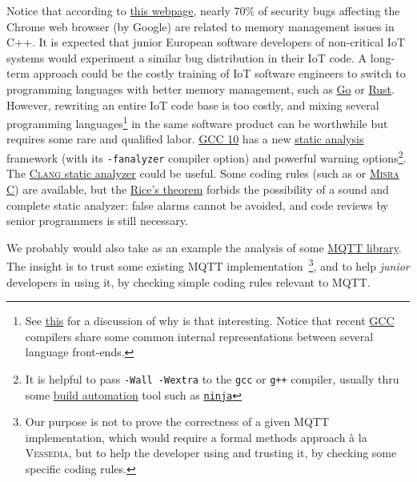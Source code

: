Notice that according to
\href{https://www.zdnet.com/article/chrome-70-of-all-security-bugs-are-memory-safety-issues/}{this
  webpage}, nearly 70\% of security bugs affecting the Chrome web
browser (by Google) are related to memory management issues in C++.
It is expected that junior European software developers of
non-critical IoT systems would experiment a similar bug distribution
in their IoT code. A long-term approach could be the costly training
of IoT software engineers to switch to programming languages with
better memory management, such as \href{https://golang.org/}{Go} or
\href{https://www.rust-lang.org/}{Rust}. However, rewriting an entire
IoT code base is too costly, and mixing several programming
languages\footnote{See
\href{https://softwareengineering.stackexchange.com/questions/370135/why-are-multiple-programming-languages-used-in-the-development-of-one-product-or}{this}
for a discussion of why is that interesting. Notice that recent
\href{http://gcc.gnu.org/}{GCC} compilers share some common internal
representations between several language front-ends.} in the same
software product can be worthwhile but requires some rare and
qualified labor. \href{https://gcc.gnu.org/gcc-10}{GCC 10} has a new
\href{https://gcc.gnu.org/onlinedocs/gcc/Static-Analyzer-Options.html}{static
  analysis} framework (with its \texttt{-fanalyzer} compiler option)
and powerful warning options\footnote{It is helpful to pass
\texttt{-Wall -Wextra} to the \texttt{gcc} or \texttt{g++} compiler,
usually thru some
\href{https://en.wikipedia.org/wiki/Build_automation}{build
  automation} tool such as
\href{http://ninja-build.org/}{\texttt{ninja}}}. The
\href{https://clang-analyzer.llvm.org/}{\textsc{Clang} static
  analyzer} could be useful. Some coding rules (such as
\cite{Holzmann:2006:power-of-10} or 
\href{https://www.misra.org.uk/}{\textsc{Misra C}}) are available, but
the \href{https://en.wikipedia.org/wiki/Rice's_theorem}{Rice's
  theorem}  forbids the possibility of a sound
and complete static analyzer: false alarms cannot be avoided, and code 
reviews by senior programmers is still necessary.

We probably would also take as an example the analysis of some
\href{http://mqtt.org/}{MQTT library}. The insight is to trust some
existing MQTT implementation~\footnote{Our purpose is not to prove the
  correctness of a given MQTT implementation, which would require a
  formal methods approach à la \textsc{Vessedia}, but to help the
  developer using and trusting it, by checking some specific coding
  rules.}, and to help \emph{junior} developers in using it, by
checking simple coding rules relevant to MQTT.

